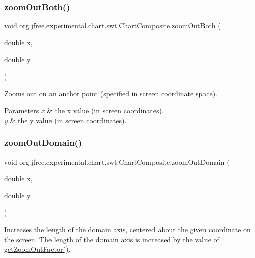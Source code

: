 \subsubsection{\texorpdfstring{zoom\+Out\+Both()}{zoomOutBoth()}}
{\footnotesize\ttfamily void org.\+jfree.\+experimental.\+chart.\+swt.\+Chart\+Composite.\+zoom\+Out\+Both (\begin{DoxyParamCaption}\item[{double}]{x,  }\item[{double}]{y }\end{DoxyParamCaption})}

Zooms out on an anchor point (specified in screen coordinate space).


\begin{DoxyParams}{Parameters}
{\em x} & the x value (in screen coordinates). \\
\hline
{\em y} & the y value (in screen coordinates). \\
\hline
\end{DoxyParams}
\mbox{\label{classorg_1_1jfree_1_1experimental_1_1chart_1_1swt_1_1_chart_composite_a7d9320ff86f75dcf741a625be457c1fc}} 
\subsubsection{\texorpdfstring{zoom\+Out\+Domain()}{zoomOutDomain()}}
{\footnotesize\ttfamily void org.\+jfree.\+experimental.\+chart.\+swt.\+Chart\+Composite.\+zoom\+Out\+Domain (\begin{DoxyParamCaption}\item[{double}]{x,  }\item[{double}]{y }\end{DoxyParamCaption})}

Increases the length of the domain axis, centered about the given coordinate on the screen. The length of the domain axis is increased by the value of \mbox{\hyperlink{classorg_1_1jfree_1_1experimental_1_1chart_1_1swt_1_1_chart_composite_acfca8f3fd361b336c10d53ace3bc6251}{get\+Zoom\+Out\+Factor()}}.


